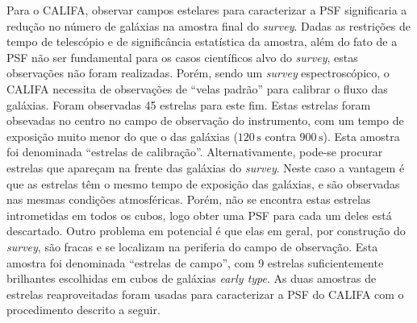 Para o CALIFA, observar campos estelares para caracterizar a PSF significaria a
redução no número de galáxias na amostra final do {\em survey}. Dadas as
restrições de tempo de telescópio e de significância estatística da amostra,
além do fato de a PSF não ser fundamental para os casos científicos alvo do {\em
survey}, estas observações não foram realizadas. Porém, sendo um {\em survey}
espectroscópico, o CALIFA necessita de observações de ``velas padrão'' para
calibrar o fluxo das galáxias. Foram observadas 45 estrelas para este fim.
Estas estrelas foram obsevadas no centro no campo de observação do instrumento,
com um tempo de exposição muito menor do que o das galáxias ($120\,\mathrm{s}$
contra $900\,\mathrm{s}$). Esta amostra foi denominada ``estrelas de
calibração''. Alternativamente, pode-se procurar estrelas que apareçam na frente
das galáxias do {\em survey}. Neste caso a vantagem é que as estrelas têm o
mesmo tempo de exposição das galáxias, e são observadas nas mesmas condições
atmosféricas. Porém, não se encontra estas estrelas intrometidas em todos os
cubos, logo obter uma PSF para cada um deles está descartado. Outro problema em
potencial é que elas em geral, por construção do {\em survey}, são fracas e se
localizam na periferia do campo de observação. Esta amostra foi denominada
``estrelas de campo'', com 9 estrelas suficientemente brilhantes escolhidas em
cubos de galáxias {\em early type}. As duas amostras de estrelas reaproveitadas
foram usadas para caracterizar a PSF do CALIFA com o procedimento descrito a
seguir.

